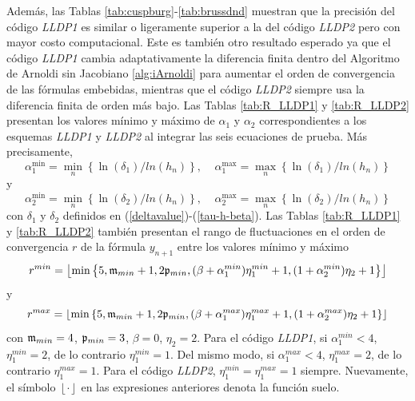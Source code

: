 Además, las Tablas \ref{tab:cuspburg}-\ref{tab:brussdnd} muestran que la precisión del código \emph{LLDP1} es similar o ligeramente superior a la del código \emph{LLDP2} pero con mayor costo computacional. Este es también otro resultado esperado ya que el código \emph{LLDP1} cambia adaptativamente la diferencia finita dentro del Algoritmo de Arnoldi sin Jacobiano \ref{alg:iArnoldi} para aumentar el orden de convergencia de las fórmulas embebidas, mientras que el código \emph{ LLDP2} siempre usa la diferencia finita de orden más bajo. Las Tablas \ref{tab:R_LLDP1} y \ref{tab:R_LLDP2} presentan los valores mínimo y máximo de $\alpha _{1}$ y $\alpha _{2}$ correspondientes a los esquemas \emph{LLDP1} y \emph{LLDP2} al integrar las seis ecuaciones de prueba. Más precisamente,
\[\alpha _{1}^{\min }=\underset{n}{\min }\left\{ \ln (\delta
_{1})/ln(h_{n})\right\}, \;\;\;\; \alpha _{1}^{\max }=\underset{n}{\max }\left\{
\ln (\delta _{1})/ln(h_{n})\right\}\]
y
\[\alpha _{2}^{\min }=\underset{n}{\min }\left\{ \ln (\delta _{2})/ln(h_{n})\right\}, \;\;\;\; \alpha _{2}^{\max }=\underset{n}{\max }\left\{ \ln (\delta _{2})/ln(h_{n})\right\} \]
con $\delta_{1}$ y $\delta_{2}$ definidos en (\ref{deltavalue})-(\ref{tau-h-beta}). Las Tablas \ref{tab:R_LLDP1} y \ref{tab:R_LLDP2} también presentan el rango de fluctuaciones en el orden de convergencia $r$ de la fórmula $y_{n+1}$ entre los valores mínimo y máximo
\[r^{min}=\left\lfloor\mathrm{min}\left\{5,\mathfrak{m}_{min}+1,2\mathfrak{p}_{min},(\beta+\alpha^{min}_1)\eta^{min}_1+1,(1+\alpha^{min}_2)\eta_2+1 \right\} \right\rfloor\]
y
\[r^{max}=\left\lfloor\mathrm{min}\left\{5,\mathfrak{m}_{min}+1,2\mathfrak{p}_{min},(\beta+\alpha^{max}_1)\eta^{max}_1+1,(1+\alpha^{max}_2)\eta_2+1 \right\} \right\rfloor\]
con $\mathfrak{m}_{min}=4$, $\mathfrak{p}_{min}=3$, $\beta=0$, $\eta_2=2$. Para el código \emph{LLDP1}, si $\alpha^{min}_1 < 4$, $\eta^{min}_1=2$, de lo contrario $\eta^{min}_1=1$. Del mismo modo, si $\alpha^{max}_1 < 4$, $\eta^{max}_1=2$, de lo contrario $\eta^{max}_1=1$. Para el código \emph{LLDP2}, $\eta^{min}_1=\eta^{max}_1=1$ siempre. Nuevamente, el símbolo $\left\lfloor \cdot \right\rfloor$ en las expresiones anteriores denota la función suelo.



